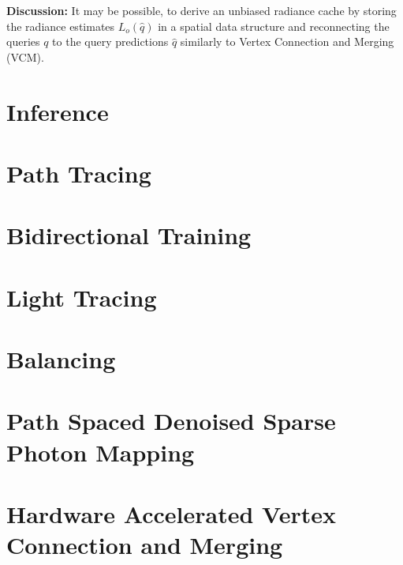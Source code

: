 \textbf{Discussion:} It may be possible, to derive an unbiased radiance cache by storing the radiance estimates $L_o(\hat{q})$ in a spatial data structure and reconnecting the queries $q$ to the query predictions $\hat{q}$ similarly to Vertex Connection and Merging (VCM). %

\section{Inference}

\section{Path Tracing}

\section{Bidirectional Training}

\section{Light Tracing}

\section{Balancing}

\section{Path Spaced Denoised Sparse Photon Mapping}

\section{Hardware Accelerated Vertex Connection and Merging}